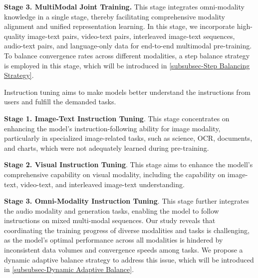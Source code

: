 \textbf{Stage 3. MultiModal Joint Training.}
This stage integrates omni-modality knowledge in a single stage, thereby facilitating comprehensive modality alignment and unified representation learning. In this stage, we incorporate high-quality image-text pairs, video-text pairs, interleaved image-text sequences, audio-text pairs, and language-only data for end-to-end multimodal pre-training.
To balance convergence rates across different modalities, a step balance strategy is employed in this stage, which will be introduced in \cref{subsubsec-Step Balancing Strategy}.





Instruction tuning aims to make models better understand the instructions from users and fulfill the demanded tasks.

\textbf{Stage 1. Image-Text Instruction Tuning}.
This stage concentrates on enhancing the model's instruction-following ability for image modality, particularly in specialized image-related tasks, such as science, OCR, documents, and charts, which were not adequately learned during pre-training.

\textbf{Stage 2. Visual Instruction Tuning}.
This stage aims to enhance the modell's comprehensive capability on visual modality, including the capability on image-text, video-text, and interleaved image-text understanding.

\textbf{Stage 3. Omni-Modality Instruction Tuning}.
This stage further integrates the audio modality and generation tasks, enabling the model to follow instructions on mixed multi-modal sequences. Our study reveals that coordinating the training progress of diverse modalities and tasks is challenging, as the model's optimal performance across all modalities is hindered by inconsistent data volumes and convergence speeds among tasks. We propose a dynamic adaptive balance strategy to address this issue, which will be introduced in \cref{subsubsec-Dynamic Adaptive Balance}.


